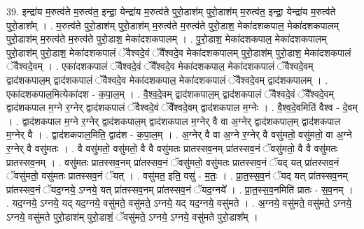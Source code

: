 \documentclass[17pt]{extarticle}
\begin{document}
39. इन्द्रा॑य म॒रुत्व॑ते म॒रुत्व॑त॒ इन्द्रा॒ येन्द्रा॑य म॒रुत्व॑ते पुरो॒डाश॑म् पुरो॒डाश॑म् म॒रुत्व॑त॒ इन्द्रा॒
येन्द्रा॑य म॒रुत्व॑ते पुरो॒डाश᳚म् । . म॒रुत्व॑ते पुरो॒डाश॑म् पुरो॒डाश॑म् म॒रुत्व॑ते म॒रुत्व॑ते पुरो॒डाश॒ मेका॑दशकपाल॒ मेका॑दशकपालम् पुरो॒डाश॑म् म॒रुत्व॑ते म॒रुत्व॑ते पुरो॒डाश॒ मेका॑दशकपालम् । . पु॒रो॒डाश॒ मेका॑दशकपाल॒ मेका॑दशकपालम् पुरो॒डाश॑म् पुरो॒डाश॒ मेका॑दशकपालं ॅवैश्वदे॒वं ॅवै᳚श्वदे॒व मेका॑दशकपालम् पुरो॒डाश॑म् पुरो॒डाश॒ मेका॑दशकपालं ॅवैश्वदे॒वम् । . एका॑दशकपालं ॅवैश्वदे॒वं ॅवै᳚श्वदे॒व मेका॑दशकपाल॒ मेका॑दशकपालं ॅवैश्वदे॒वम् द्वाद॑शकपाल॒म् द्वाद॑शकपालं ॅवैश्वदे॒व मेका॑दशकपाल॒ मेका॑दशकपालं ॅवैश्वदे॒वम् द्वाद॑शकपालम् । . एका॑दशकपाल॒मित्येका॑दश - क॒पा॒ल॒म् । . वै॒श्व॒दे॒वम् द्वाद॑शकपाल॒म् द्वाद॑शकपालं ॅवैश्वदे॒वं ॅवै᳚श्वदे॒वम् द्वाद॑शकपाल म॒ग्ने र॒ग्नेर् द्वाद॑शकपालं ॅवैश्वदे॒वं ॅवै᳚श्वदे॒वम् द्वाद॑शकपाल म॒ग्नेः । . वै॒श्व॒दे॒वमिति॑ वैश्व - दे॒वम् । . द्वाद॑शकपाल म॒ग्ने र॒ग्नेर् द्वाद॑शकपाल॒म् द्वाद॑शकपाल म॒ग्नेर् वै वा अ॒ग्नेर् द्वाद॑शकपाल॒म् द्वाद॑शकपाल म॒ग्नेर् वै । . द्वाद॑शकपाल॒मिति॒ द्वाद॑श - क॒पा॒ल॒म् । . अ॒ग्नेर् वै वा अ॒ग्ने र॒ग्नेर् वै वसु॑मतो॒ वसु॑मतो॒ वा अ॒ग्ने र॒ग्नेर् वै वसु॑मतः । . वै वसु॑मतो॒ वसु॑मतो॒ वै वै वसु॑मतः प्रातस्सव॒नम् प्रा॑तस्सव॒नं ॅवसु॑मतो॒ वै वै वसु॑मतः प्रातस्सव॒नम् । . वसु॑मतः प्रातस्सव॒नम् प्रा॑तस्सव॒नं ॅवसु॑मतो॒ वसु॑मतः प्रातस्सव॒नं ॅयद् यत् प्रा॑तस्सव॒नं ॅवसु॑मतो॒ वसु॑मतः प्रातस्सव॒नं ॅयत् । . वसु॑मत॒ इति॒ वसु॑ - म॒तः॒ । . प्रा॒त॒स्स॒व॒नं ॅयद् यत् प्रा॑तस्सव॒नम् प्रा॑तस्सव॒नं ॅयद॒ग्नये॒ ऽग्नये॒ यत् प्रा॑तस्सव॒नम् प्रा॑तस्सव॒नं ॅयद॒ग्नये᳚ । . प्रा॒त॒स्स॒व॒नमिति॑ प्रातः - स॒व॒नम् । . यद॒ग्नये॒ ऽग्नये॒ यद् यद॒ग्नये॒ वसु॑मते॒ वसु॑मते॒ ऽग्नये॒ यद् यद॒ग्नये॒ वसु॑मते । . अ॒ग्नये॒ वसु॑मते॒ वसु॑मते॒ ऽग्नये॒ ऽग्नये॒ वसु॑मते पुरो॒डाश॑म् पुरो॒डाशं॒ ॅवसु॑मते॒ ऽग्नये॒ ऽग्नये॒ वसु॑मते पुरो॒डाश᳚म् । \newline
\end{document}
